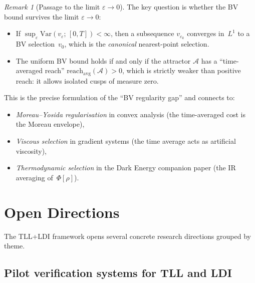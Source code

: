 \documentclass[12pt,a4paper]{article}
\theoremstyle{definition}
\theoremstyle{plain}
\theoremstyle{remark}
\newtheorem{remark}[definition]{Remark}
\newcommand{\Var}{\mathrm{Var}}
\begin{document}
\begin{remark}[Passage to the limit $\varepsilon \to 0$]
\label{rem:epsilon-limit}
The key question is whether the BV bound survives the limit
$\varepsilon \to 0$:
\begin{itemize}
\item If\; $\sup_\varepsilon \Var(v_\varepsilon;\,[0,T]) < \infty$,
  then a subsequence $v_{\varepsilon_k}$ converges in~$L^1$ to a BV
  selection~$v_0$, which is the \emph{canonical} nearest-point
  selection.
\item The uniform BV bound holds if and only if the attractor
  $\mathcal{A}$ has a ``time-averaged reach''
  $\mathrm{reach}_{\mathrm{avg}}(\mathcal{A}) > 0$, which is
  strictly weaker than positive reach: it allows isolated cusps of
  measure zero.
\end{itemize}
This is the precise formulation of the ``BV regularity gap'' and
connects to:
\begin{itemize}
\item \emph{Moreau--Yosida regularisation} in convex analysis (the
  time-averaged cost is the Moreau envelope),
\item \emph{Viscous selection} in gradient systems (the time average
  acts as artificial viscosity),
\item \emph{Thermodynamic selection} in the Dark Energy companion
  paper (the IR averaging of~$\Phi[\rho]$).
\end{itemize}
\end{remark}


\section{Open Directions}
\label{sec:open-directions}

The TLL+LDI framework opens several concrete research directions
grouped by theme.

\subsection{Pilot verification systems for TLL and LDI}
\end{document}
